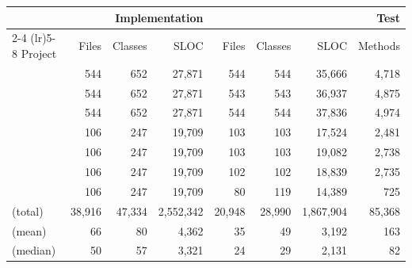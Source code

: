   \begin{tabular*}{\linewidth}{@{\hspace{\tabcolsep}\extracolsep{\fill}}lrrrrrrr}
  \toprule
   & \multicolumn{3}{r}{Implementation} & \multicolumn{4}{r}{Test} \\
  \cmidrule(lr){2-4} \cmidrule(lr){5-8}
  Project & Files & Classes & SLOC & Files & Classes & SLOC & Methods \\
  \midrule
  \DatasetEqBenchA{} & 544 & 652 & 27,871 & 544 & 544 & 35,666 & 4,718 \\
  \DatasetEqBenchB{} & 544 & 652 & 27,871 & 543 & 543 & 36,937 & 4,875 \\
  \DatasetEqBenchC{} & 544 & 652 & 27,871 & 544 & 544 & 37,836 & 4,974 \\
  \DatasetCommonsA{} & 106 & 247 & 19,709 & 103 & 103 & 17,524 & 2,481 \\
  \DatasetCommonsB{} & 106 & 247 & 19,709 & 103 & 103 & 19,082 & 2,738 \\
  \DatasetCommonsC{} & 106 & 247 & 19,709 & 102 & 102 & 18,839 & 2,735 \\
  \DatasetCommonsDev{} & 106 & 247 & 19,709 & 80 & 119 & 14,389 & 725 \\
  \DatasetRepoReapers{} (total) & 38,916 & 47,334 & 2,552,342 & 20,948 & 28,990 & 1,867,904 & 85,368 \\
  \DatasetRepoReapers{} (mean) & 66 & 80 & 4,362 & 35 & 49 & 3,192 & 163 \\
  \DatasetRepoReapers{} (median) & 50 & 57 & 3,321 & 24 & 29 & 2,131 & 82 \\
  \bottomrule
  \end{tabular*}
